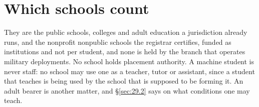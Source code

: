 \section{Which schools count}
\label{sec:29.11}
They are the public schools, colleges and adult education a jurisdiction already runs, and the nonprofit nonpublic schools the registrar certifies, funded as institutions and not per student, and none is held by the branch that operates military deployments. No school holds placement authority. A machine student is never staff: no school may use one as a teacher, tutor or assistant, since a student that teaches is being used by the school that is supposed to be forming it. An adult bearer is another matter, and \S\ref{sec:29.2} says on what conditions one may teach.
